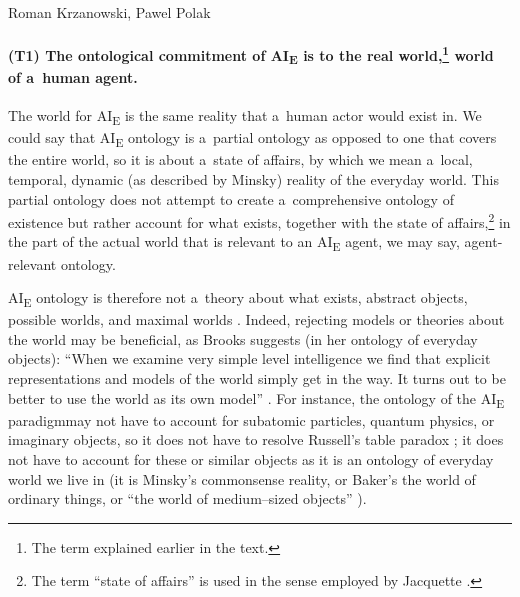 \begin{artengenv2auth}{Roman Krzanowski, Pawel Polak}
\paragraph[(T1) The ontological commitment]{(T1) The ontological commitment of AI\textsubscript{E} is to the real world,\footnote{The term explained earlier in the text.} world of a~human agent.}%
 The world for AI\textsubscript{E} is the same reality that a~human actor would exist in. We could say that AI\textsubscript{E} ontology is a~partial ontology as opposed to one that covers the entire world, so it is about a~state of affairs, by which we mean a~local, temporal, dynamic (as described by Minsky) reality of the everyday world. This partial ontology does not attempt to create a~comprehensive ontology of existence but rather account for what exists, together with the state of affairs,\footnote{The term ``state of affairs'' is used in the sense employed by Jacquette
\parencite*[][]{jacquette_ontology_2002}.%
} in the part of the actual world that is relevant to an AI\textsubscript{E} agent, we may say, agent-relevant ontology.

AI\textsubscript{E} ontology is therefore not a~theory about what exists, abstract objects, possible worlds, and maximal worlds
\parencites[e.g.,][]{mulligan_worlds_1992}[][]{textor_states_2021}. %
 Indeed, rejecting models or theories about the world may be beneficial, as Brooks suggests (in her ontology of everyday objects): ``When we examine very simple level intelligence we find that explicit representations and models of the world simply get in the way. It turns out to be better to use the world as its own model'' 
\parencite[][]{brooks_intelligence_1991}. %
 For instance, the ontology of the AI\textsubscript{E} paradigmmay not have to account for subatomic particles, quantum physics, or imaginary objects, so it does not have to resolve Russell's table paradox 
\parencite[][]{russell_problems_1912}; %
 it does not have to account for these or similar objects as it is an ontology of everyday world we live in (it is Minsky's commonsense reality, or Baker's the world of ordinary things, or ``the world of medium–sized objects'' 
\parencite[][p.18]{baker_metaphysics_2007}%
).


\end{artengenv2auth}
